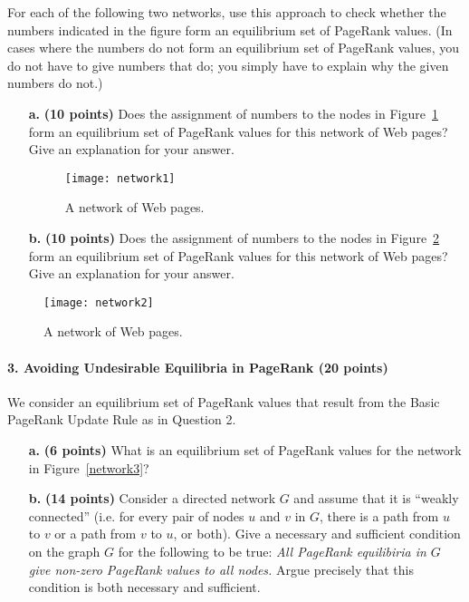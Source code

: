 \documentclass[11pt]{article}
\begin{document}
For each of the following two networks, use this approach to check whether the
numbers indicated in the figure form an equilibrium set of PageRank values. (In
cases where the numbers do not form an equilibrium set of PageRank values, you
do not have to give numbers that do; you simply have to explain why the given
numbers do not.)

\begin{itemize}
\item[\textbf{a. }] \textbf{(10 points)} Does the assignment of numbers to the nodes in Figure~\ref{network1} form an
equilibrium set of PageRank values for this network of Web pages? Give
an explanation for your answer.

\begin{figure}
\centering
\texttt{[image: network1]}
\caption{A network of Web pages.}
\label{network1}
\end{figure}

\item[\textbf{b. }] \textbf{(10 points)} Does the assignment of numbers to the nodes in Figure~\ref{network2}  form an equilibrium set of PageRank values for this network of Web pages? Give an explanation for your answer.
\end{itemize}

\begin{figure}
\centering
\texttt{[image: network2]}
\caption{A network of Web pages.}
\label{network2}
\end{figure}

\paragraph{3. Avoiding Undesirable Equilibria in PageRank (20 points)}

We consider an equilibrium set of PageRank values that result from the Basic PageRank Update Rule as in Question 2.

\begin{itemize}
\item[\textbf{a. }] \textbf{(6 points)} What is an equilibrium set of PageRank values for the network in Figure~\ref{network3}?

\item[\textbf{b. }]  \textbf{(14 points)} Consider a directed network $G$ and assume that it is ``weakly connected'' (i.e. for every pair of nodes $u$ and $v$ in $G$, there is a path from $u$ to $v$ or a path from $v$ to $u$, or both). Give a necessary and sufficient condition on the graph $G$ for the following to be true: \emph{All PageRank equilibiria in $G$ give non-zero PageRank values to all nodes.}   Argue precisely that this condition is both necessary and sufficient.
\end{itemize}
\end{document}
